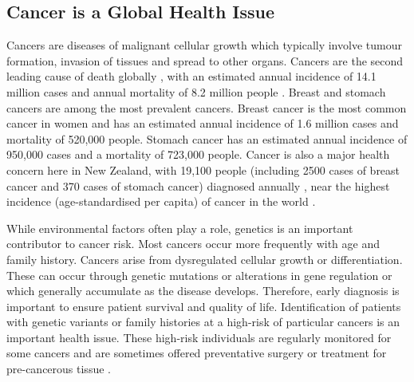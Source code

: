 \subsection{Cancer is a Global Health Issue}
Cancers are diseases of malignant cellular growth which typically involve \gls{tumour} formation, invasion of tissues and spread to other organs. Cancers are the second leading cause of death globally \citep{WorldHealthOrg2017}, with an estimated annual incidence of 14.1 million cases and annual mortality of 8.2 million people \citep{Ferlay2015}. Breast and stomach \glspl{cancer} are among the most prevalent \glspl{cancer}. Breast cancer is the most common \gls{cancer} in women and has an estimated annual incidence of 1.6 million cases and mortality of 520,000 people. Stomach cancer has an estimated annual incidence of 950,000 cases and a mortality of 723,000 people. Cancer is also a major health concern here in New Zealand, with 19,100 people (including 2500 cases of breast cancer and 370 cases of stomach cancer) diagnosed annually \citep{CIX2013}, near the highest incidence (age-standardised per capita) of \gls{cancer} in the world \citep{Ferlay2015}.   

While environmental factors often play a role, genetics is an important contributor to cancer risk. Most \glspl{cancer} occur more frequently with age and family history. Cancers arise from dysregulated cellular growth or differentiation. These can occur through genetic \glspl{mutation} or alterations in gene regulation or  which generally accumulate as the disease develops.
Therefore, early diagnosis is important to ensure patient survival and quality of life.
Identification of patients with genetic variants or family histories at a high-risk of particular cancers is an important health issue.
These high-risk individuals are regularly monitored for some cancers and are sometimes offered preventative surgery or treatment for pre-cancerous tissue \citep{Scheuer2002, Guilford2010}. 

